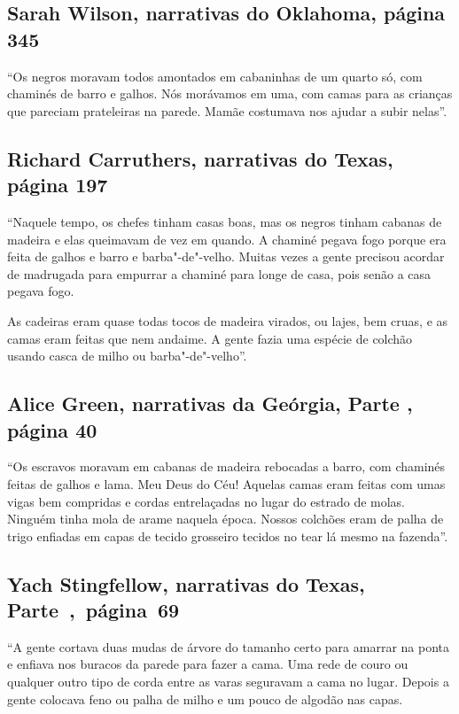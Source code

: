 \subsection{Sarah Wilson, narrativas do Oklahoma, página 345}
\label{ref300}

``Os negros moravam todos amontados em cabaninhas de um quarto só, com
chaminés de barro e galhos. Nós morávamos em uma, com camas para as
crianças que pareciam prateleiras na parede. Mamãe costumava nos ajudar
a subir nelas''.

\subsection{Richard Carruthers, narrativas do Texas, página 197} \label{ref49}

``Naquele tempo, os chefes tinham casas boas, mas os negros tinham
cabanas de madeira e elas queimavam de vez em quando. A chaminé pegava
fogo porque era feita de galhos e barro e barba"-de"-velho. Muitas vezes a
gente precisou acordar de madrugada para empurrar a chaminé para longe
de casa, pois senão a casa pegava fogo.

As cadeiras eram quase todas tocos de madeira virados, ou lajes, bem
cruas, e as camas eram feitas que nem andaime. A gente fazia uma espécie
de colchão usando casca de milho ou barba"-de"-velho''.

\subsection{Alice Green, narrativas da Geórgia, Parte , página 40}
\label{ref108}

``Os escravos moravam em cabanas de madeira rebocadas a barro, com
chaminés feitas de galhos e lama. Meu Deus do Céu! Aquelas camas eram
feitas com umas vigas bem compridas e cordas entrelaçadas no lugar do
estrado de molas. Ninguém tinha mola de arame naquela época. Nossos
colchões eram de palha de trigo enfiadas em capas de tecido grosseiro
tecidos no tear lá mesmo na fazenda''.

\subsection{Yach Stingfellow, narrativas do Texas, Parte~,~página~69}
\label{ref255} 

``A gente cortava duas mudas de árvore do tamanho certo para amarrar na
ponta e enfiava nos buracos da parede para fazer a cama. Uma rede de
couro ou qualquer outro tipo de corda entre as varas seguravam a cama no
lugar. Depois a gente colocava feno ou palha de milho e um pouco de
algodão nas capas.

